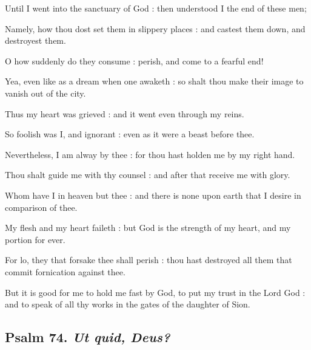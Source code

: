 Until I went into the sanctuary of God : then understood I the end of these men;\par
{}Namely, how thou dost set them in slippery places : and castest them down, and destroyest them.\par
{}O how suddenly do they consume : perish, and come to a fearful end!\par
{}Yea, even like as a dream when one awaketh : so shalt thou make their image to vanish out of the city.\par
{}Thus my heart was grieved : and it went even through my reins.\par
{}So foolish was I, and ignorant : even as it were a beast before thee.\par
{}Nevertheless, I am alway by thee : for thou hast holden me by my right hand.\par
{}Thou shalt guide me with thy counsel : and after that receive me with glory.\par
{}Whom have I in heaven but thee : and there is none upon earth that I desire in comparison of thee.\par
{}My flesh and my heart faileth : but God is the strength of my heart, and my portion for ever.\par
{}For lo, they that forsake thee shall perish : thou hast destroyed all them that commit fornication against thee.\par
{}But it is good for me to hold me fast by God, to put my trust in the Lord God : and to speak of all thy works in the gates of the daughter of Sion.\par

\clearpage
\subsection{Psalm 74. \textit{Ut quid, Deus?}}


